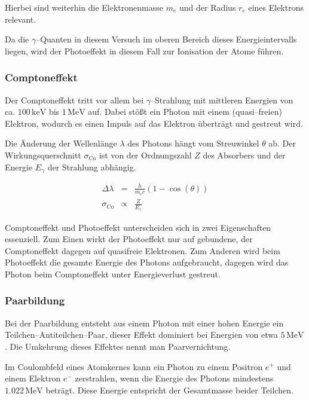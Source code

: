 \documentclass[12pt,a4paper]{scrartcl}
\numberwithin{equation}{section} %
\newcommand{\pu}[1]{\ensuremath{\mathrm{#1}}}
\begin{document}
\noindent
Hierbei sind weiterhin die Elektronenmasse $m_e$ und der Radius $r_e$ eines Elektrons relevant.

Da die $\gamma$--Quanten in diesem Versuch im oberen Bereich dieses Energieintervalls liegen, wird der Photoeffekt in diesem Fall zur Ionisation der Atome führen.

\hypertarget{comptoneffekt}{%
\subsubsection{Comptoneffekt}\label{comptoneffekt}}

Der Comptoneffekt tritt vor allem bei $\gamma$--Strahlung mit mittleren Energien von ca. $\pu{100\, keV}$ bis $\pu{1\, MeV}$ auf. Dabei stößt ein Photon mit einem (quasi--freien) Elektron, wodurch es einen Impuls auf das Elektron überträgt und gestreut wird.

Die Änderung der Wellenlänge $\lambda$ des Photons hängt vom Streuwinkel $\theta$ ab. Der Wirkungsquerschnitt $\sigma_\mathrm{Co}$ ist von der Ordnungszahl $Z$ des Absorbers und der Energie $E_\gamma$ der Strahlung abhängig. \cite{Bethge}

\begin{eqnarray}
    \Delta \lambda &=& \frac{h}{m_e c} (1 - \cos(\theta)) \\
    \sigma_\mathrm{Co} &\propto & \frac{Z}{E_\gamma}
\end{eqnarray}

\noindent
Comptoneffekt und Photoeffekt unterscheiden sich in zwei Eigenschaften essenziell. Zum Einen wirkt der Photoeffekt nur auf gebundene, der Comptoneffekt dagegen auf quasifreie Elektronen. Zum Anderen wird beim Photoeffekt die gesamte Energie des Photons aufgebraucht, dagegen wird das Photon beim Comptoneffekt unter Energieverlust gestreut.

\hypertarget{paarbildung}{%
\subsubsection{Paarbildung}\label{paarbildung}}

Bei der Paarbildung entsteht aus einem Photon mit einer hohen Energie ein Teilchen--Antiteilchen--Paar, dieser Effekt dominiert bei Energien von etwa $\pu{5\, MeV}$. Die Umkehrung dieses Effektes nennt man Paarvernichtung.

Im Coulombfeld eines Atomkernes kann ein Photon zu einem Positron $e^+$ und einem Elektron $e^-$ zerstrahlen, wenn die Energie des Photons mindestens $\pu{1.022\, MeV}$ beträgt. Diese Energie entspricht der Gesamtmasse beider Teilchen.
\end{document}

